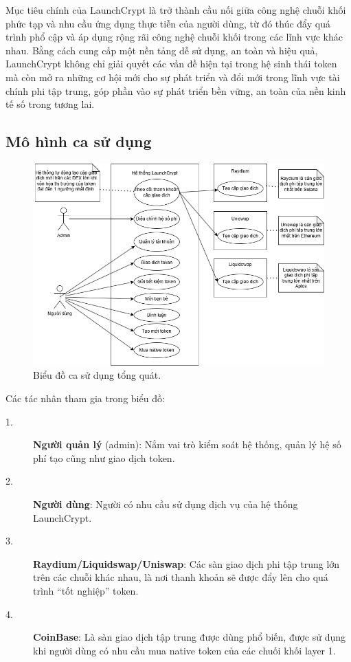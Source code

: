 Mục tiêu chính của LaunchCrypt là trở thành cầu nối giữa công
nghệ chuỗi khối phức tạp và nhu cầu ứng dụng thực tiễn của người dùng, từ đó
thúc đẩy quá trình phổ cập và áp dụng rộng rãi công nghệ chuỗi khối trong các
lĩnh vực khác nhau. Bằng cách cung cấp một nền tảng dễ sử dụng, an toàn và hiệu
quả, LaunchCrypt không chỉ giải quyết các vấn đề hiện tại trong hệ sinh thái
token mà còn mở ra những cơ hội mới cho sự phát triển và đổi mới trong lĩnh vực
tài chính phi tập trung, góp phần vào sự phát triển bền vững, an toàn của nền kinh tế 
số trong tương lai.

\subsection{Mô hình ca sử dụng}
\label{sec:muc2.2}
\begin{figure}[H]
    \begin{center}
        \includegraphics[width=1\textwidth]{figures/c2/UC Overall.png}
        \caption{Biểu đồ ca sử dụng tổng quát.}
        \label{fig:feature_interaction_example}
    \end{center}
\end{figure}

Các tác nhân tham gia trong biểu đồ:
\begin{description}
    \item[1.] \textbf{Người quản lý} (admin): Nắm vai trò kiểm soát hệ thống, quản
        lý hệ số phí tạo cũng như giao dịch token.

    \item[2.] \textbf{Người dùng}: Người có nhu cầu sử dụng dịch vụ của hệ thống
        LaunchCrypt.

    \item[3.] \textbf{Raydium/Liquidswap/Uniswap}: Các sàn giao dịch phi tập trung
        lớn trên các
        chuỗi khác nhau, là nơi thanh khoản sẽ được đẩy lên cho quá trình ``tốt
        nghiệp'' token.

    \item[4.] \textbf{CoinBase}: Là sàn giao dịch tập trung được dùng phổ biến,
        được sử dụng khi
        người dùng có nhu cầu mua native token của các chuối khối layer 1.
\end{description}



